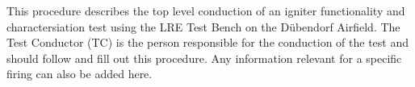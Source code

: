 This procedure describes the top level conduction of an igniter functionality and charactersiation test using the LRE Test Bench on the Dübendorf Airfield. The Test Conductor (TC) is the person responsible for the conduction of the test and should follow and fill out this procedure.
Any information relevant for a specific firing can also be added here.
